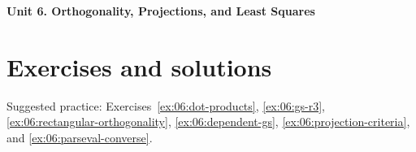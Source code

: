 \documentclass[12pt]{article}
\begin{document}
{\Large\bfseries Unit 6. Orthogonality, Projections, and Least Squares}\par

\clearpage
\section*{Exercises and solutions}
Suggested practice: Exercises~\ref{ex:06:dot-products},
\ref{ex:06:gs-r3}, \ref{ex:06:rectangular-orthogonality},
\ref{ex:06:dependent-gs}, \ref{ex:06:projection-criteria}, and
\ref{ex:06:parseval-converse}.

\end{document}
